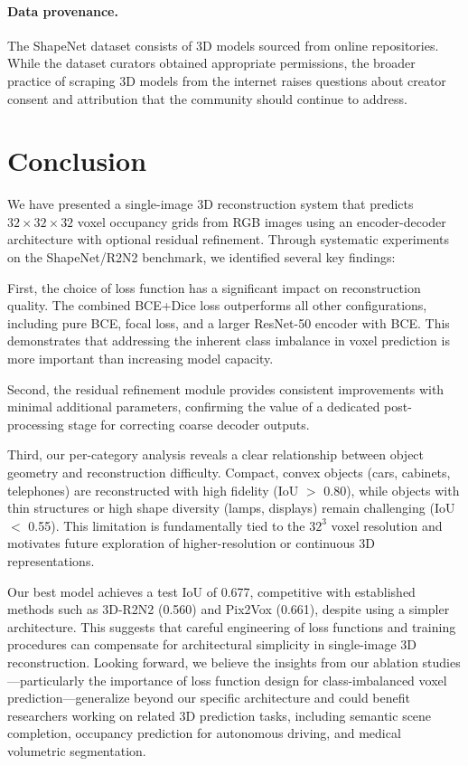 \documentclass[10pt,twocolumn,letterpaper]{article}
\begin{document}
\paragraph{Data provenance.} The ShapeNet dataset consists of 3D models sourced from online repositories. While the dataset curators obtained appropriate permissions, the broader practice of scraping 3D models from the internet raises questions about creator consent and attribution that the community should continue to address.

\section{Conclusion}
\label{sec:conclusion}

We have presented a single-image 3D reconstruction system that predicts $32 \times 32 \times 32$ voxel occupancy grids from RGB images using an encoder-decoder architecture with optional residual refinement. Through systematic experiments on the ShapeNet/R2N2 benchmark, we identified several key findings:

First, the choice of loss function has a significant impact on reconstruction quality. The combined BCE+Dice loss outperforms all other configurations, including pure BCE, focal loss, and a larger ResNet-50 encoder with BCE. This demonstrates that addressing the inherent class imbalance in voxel prediction is more important than increasing model capacity.

Second, the residual refinement module provides consistent improvements with minimal additional parameters, confirming the value of a dedicated post-processing stage for correcting coarse decoder outputs.

Third, our per-category analysis reveals a clear relationship between object geometry and reconstruction difficulty. Compact, convex objects (cars, cabinets, telephones) are reconstructed with high fidelity (IoU $>$ 0.80), while objects with thin structures or high shape diversity (lamps, displays) remain challenging (IoU $<$ 0.55). This limitation is fundamentally tied to the $32^3$ voxel resolution and motivates future exploration of higher-resolution or continuous 3D representations.

Our best model achieves a test IoU of 0.677, competitive with established methods such as 3D-R2N2 (0.560) and Pix2Vox (0.661), despite using a simpler architecture. This suggests that careful engineering of loss functions and training procedures can compensate for architectural simplicity in single-image 3D reconstruction. Looking forward, we believe the insights from our ablation studies---particularly the importance of loss function design for class-imbalanced voxel prediction---generalize beyond our specific architecture and could benefit researchers working on related 3D prediction tasks, including semantic scene completion, occupancy prediction for autonomous driving, and medical volumetric segmentation.
\end{document}
